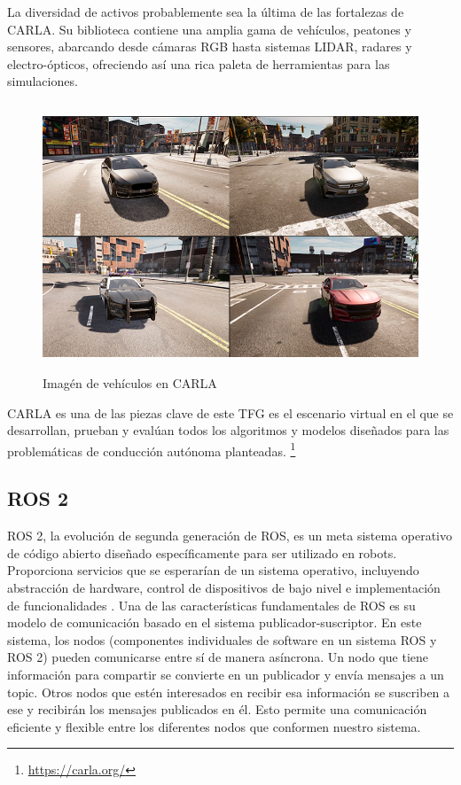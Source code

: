 \bigskip

La diversidad de activos probablemente sea la última de las fortalezas de CARLA. Su biblioteca contiene una amplia gama de vehículos, peatones y sensores, abarcando desde cámaras RGB hasta sistemas LIDAR, radares y electro-ópticos, ofreciendo así una rica paleta de herramientas para las simulaciones.

\bigskip

\begin{figure} [H]
	\begin{center}
	\includegraphics[height=8cm]{imagenes/cap3/carla.jpg}
	\end{center}
	\caption[Imagén de vehículos en CARLA]{Imagén de vehículos en CARLA}
	\label{fig:CARLA_vehicles}
\end{figure}

CARLA es una de las piezas clave de este \ac{TFG} es el escenario virtual en el que se desarrollan, prueban y evalúan todos los algoritmos y modelos diseñados para las problemáticas de conducción autónoma planteadas. \footnote{\url{https://carla.org/}}


\subsection{ROS 2}
\label{subsec:Ros 2}

ROS 2, la evolución de segunda generación de ROS, es un meta sistema operativo de código abierto diseñado específicamente para ser utilizado en robots. Proporciona servicios que se esperarían de un sistema operativo, incluyendo abstracción de hardware, control de dispositivos de bajo nivel e implementación de funcionalidades \cite{introducción_a_ros}. Una de las características fundamentales de ROS es su modelo de comunicación basado en el sistema publicador-suscriptor. En este sistema, los nodos (componentes individuales de software en un sistema ROS y ROS 2) pueden comunicarse entre sí de manera asíncrona. Un nodo que tiene información para compartir se convierte en un publicador y envía mensajes a un topic. Otros nodos que estén interesados en recibir esa información se suscriben a ese y recibirán los mensajes publicados en él. Esto permite una comunicación eficiente y flexible entre los diferentes nodos que conformen nuestro sistema.

